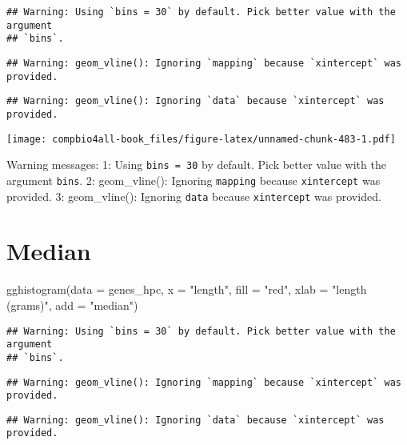 \documentclass[
]{book}
\newenvironment{Shaded}{\begin{snugshade}}{\end{snugshade}}
\newcommand{\AttributeTok}[1]{\textcolor[rgb]{0.77,0.63,0.00}{#1}}
\newcommand{\FunctionTok}[1]{\textcolor[rgb]{0.00,0.00,0.00}{#1}}
\newcommand{\NormalTok}[1]{#1}
\newcommand{\StringTok}[1]{\textcolor[rgb]{0.31,0.60,0.02}{#1}}
\begin{document}
\begin{verbatim}
## Warning: Using `bins = 30` by default. Pick better value with the argument
## `bins`.
\end{verbatim}

\begin{verbatim}
## Warning: geom_vline(): Ignoring `mapping` because `xintercept` was provided.
\end{verbatim}

\begin{verbatim}
## Warning: geom_vline(): Ignoring `data` because `xintercept` was provided.
\end{verbatim}

\texttt{[image: compbio4all-book\_files/figure-latex/unnamed-chunk-483-1.pdf]}

Warning messages:
1: Using \texttt{bins\ =\ 30} by default. Pick better value with the argument \texttt{bins}.
2: geom\_vline(): Ignoring \texttt{mapping} because \texttt{xintercept} was provided.
3: geom\_vline(): Ignoring \texttt{data} because \texttt{xintercept} was provided.

\hypertarget{median}{%
\section{Median}\label{median}}

\begin{Shaded}
\begin{Highlighting}[]
\FunctionTok{gghistogram}\NormalTok{(}\AttributeTok{data =}\NormalTok{ genes\_hpc,}
            \AttributeTok{x =} \StringTok{"length"}\NormalTok{,}
            \AttributeTok{fill =} \StringTok{"red"}\NormalTok{,}
            \AttributeTok{xlab =} \StringTok{"length (grams)"}\NormalTok{,}
            \AttributeTok{add =} \StringTok{"median"}\NormalTok{)}
\end{Highlighting}
\end{Shaded}

\begin{verbatim}
## Warning: Using `bins = 30` by default. Pick better value with the argument
## `bins`.
\end{verbatim}

\begin{verbatim}
## Warning: geom_vline(): Ignoring `mapping` because `xintercept` was provided.
\end{verbatim}

\begin{verbatim}
## Warning: geom_vline(): Ignoring `data` because `xintercept` was provided.
\end{verbatim}
\end{document}
